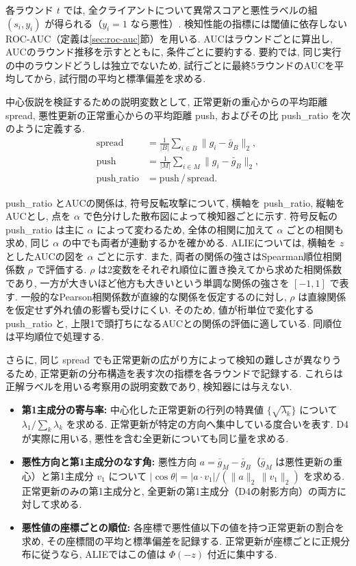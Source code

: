 \documentclass[a4j, twocolumn, dvipdfmx]{jsarticle}
\newcommand{\PushRatio}{\textrm{push\_ratio}}
\newcommand{\Spread}{\textrm{spread}}
\newcommand{\Push}{\textrm{push}}
\begin{document}
各ラウンド $t$ では, 全クライアントについて異常スコアと悪性ラベルの組 $(s_i, y_i)$ が得られる（$y_i = 1$ なら悪性）. 検知性能の指標には閾値に依存しないROC-AUC（定義は\ref{sec:roc-auc}節）を用いる. AUCはラウンドごとに算出し, AUCのラウンド推移を示すとともに, 条件ごとに要約する. 要約では, 同じ実行の中のラウンドどうしは独立でないため, 試行ごとに最終5ラウンドのAUCを平均してから, 試行間の平均と標準偏差を求める.

中心仮説を検証するための説明変数として, 正常更新の重心からの平均距離 \Spread{}, 悪性更新の正常重心からの平均距離 \Push{}, およびその比 \PushRatio{} を次のように定義する.
\begin{align*}
  \Spread &= \tfrac{1}{|B|}\textstyle\sum_{i \in B}\|g_i - \bar{g}_B\|_2, \\
  \Push   &= \tfrac{1}{|M|}\textstyle\sum_{i \in M}\|g_i - \bar{g}_B\|_2, \\
  \PushRatio &= \Push\,/\,\Spread.
\end{align*}

\PushRatio{} とAUCの関係は, 符号反転攻撃について, 横軸を \PushRatio{}, 縦軸をAUCとし, 点を $\alpha$ で色分けした散布図によって検知器ごとに示す. 符号反転の \PushRatio{} は主に $\alpha$ によって変わるため, 全体の相関に加えて $\alpha$ ごとの相関も求め, 同じ $\alpha$ の中でも両者が連動するかを確かめる. ALIEについては, 横軸を $z$ としたAUCの図を $\alpha$ ごとに示す. また, 両者の関係の強さはSpearman順位相関係数 $\rho$ で評価する. $\rho$ は2変数をそれぞれ順位に置き換えてから求めた相関係数であり, 一方が大きいほど他方も大きいという単調な関係の強さを $[-1,1]$ で表す. 一般的なPearson相関係数が直線的な関係を仮定するのに対し, $\rho$ は直線関係を仮定せず外れ値の影響も受けにくい. そのため, 値が桁単位で変化する \PushRatio{} と, 上限1で頭打ちになるAUCとの関係の評価に適している. 同順位は平均順位で処理する.

さらに, 同じ \Spread{} でも正常更新の広がり方によって検知の難しさが異なりうるため, 正常更新の分布構造を表す次の指標を各ラウンドで記録する. これらは正解ラベルを用いる考察用の説明変数であり, 検知器には与えない.
\begin{itemize}
  \item \textbf{第1主成分の寄与率:} 中心化した正常更新の行列の特異値 $\{\sqrt{\lambda_k}\}$ について $\lambda_1 / \sum_k \lambda_k$ を求める. 正常更新が特定の方向へ集中している度合いを表す. D4が実際に用いる, 悪性を含む全更新についても同じ量を求める.
  \item \textbf{悪性方向と第1主成分のなす角:} 悪性方向 $a = \bar{g}_M - \bar{g}_B$（$\bar{g}_M$ は悪性更新の重心）と第1主成分 $v_1$ について $|\cos\theta| = |a \cdot v_1| / (\|a\|_2\,\|v_1\|_2)$ を求める. 正常更新のみの第1主成分と, 全更新の第1主成分（D4の射影方向）の両方に対して求める.
  \item \textbf{悪性値の座標ごとの順位:} 各座標で悪性値以下の値を持つ正常更新の割合を求め, その座標間の平均と標準偏差を記録する. 正常更新が座標ごとに正規分布に従うなら, ALIEではこの値は $\Phi(-z)$ 付近に集中する.
\end{itemize}
\end{document}
